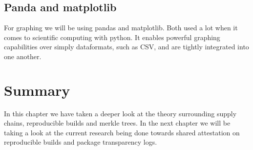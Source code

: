 \documentclass[../Main/thesis.tex]{subfiles}
\begin{document}
\subsection*{Panda and matplotlib}
For graphing we will be using pandas and matplotlib. Both used a lot when it
comes to scientific computing with python. It enables powerful graphing
capabilities over simply dataformats, such as CSV, and are tightly integrated
into one another.

\section*{Summary}\label{sec:summary-theory} 
In this chapter we have taken a deeper look at the theory surrounding supply
chains, reproducible builds and merkle trees. In the next chapter we will be
taking a look at the current research being done towards shared attestation on
reproducible builds and package transparency logs.

\blankpage
\end{document}
